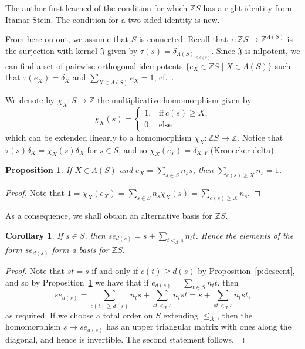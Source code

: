 \documentclass[reqno,11pt]{amsart}
\newcommand{\R}{\mathrel{\mathscr R}} %
\newtheorem{Prop}[Thm]{Proposition}
\newtheorem{Cor}[Thm]{Corollary}
{\theoremstyle{remark}
\newtheorem{Step}{Step}}
{\theoremstyle{remark}
\newtheorem{Example}[Thm]{Example}}
\numberwithin{equation}{section}
\begin{document}
The author first learned of the condition for which $\mathbb ZS$ has a right identity from Itamar Stein.  The condition for a two-sided identity is new.

From here on out, we assume that $S$ is connected.  Recall that $\tau\colon \mathbb ZS\to \mathbb Z^{\Lambda(S)}$ is the surjection with kernel $\mathfrak J$ given by $\tau(s) = \delta_{\Lambda(S)_{\leq c(s)}}$.  Since $\mathfrak J$ is nilpotent, we can find a set of pairwise orthogonal idempotents $\{e_X\in\mathbb ZS\mid X\in \Lambda(S)\}$ such that $\tau(e_X)=\delta_X$ and $\sum_{X\in \Lambda(S)}e_X=1$, cf.~\cite[Proposition 21.25]{LamBook}.  

We denote by $\chi_X\colon S\to \mathbb Z$ the multiplicative homomorphism given by \[\chi_X(s) = \begin{cases} 1, & \text{if}\ c(s)\geq X,\\ 0, & \text{else}\end{cases}\] which can be extended linearly to a homomorphism $\chi_X\colon \mathbb ZS\to \mathbb Z$.
Notice that $\tau(s)\delta_X = \chi_X(s)\delta_X$ for $s\in S$, and so $\chi_X(e_Y) = \delta_{X,Y}$ (Kronecker delta).

\begin{Prop}\label{p:support}
If $X\in \Lambda(S)$ and $e_X = \sum_{s\in S}n_ss$, then $\sum_{c(s)\geq X}n_s=1$.   \end{Prop}
\begin{proof}
Note that $1=\chi_X(e_X) = \sum_{s\in S}n_s\chi_X(s) = \sum_{c(s)\geq X} n_s$.    
\end{proof}

As a consequence, we shall obtain an alternative basis for $\mathbb ZS$.

\begin{Cor}\label{c:right.fix}
    If $s\in S$, then $se_{d(s)} = s+\sum_{t<_{\R}s} n_tt$.  Hence the elements of the form $se_{d(s)}$ form a basis for $\mathbb ZS$.
\end{Cor}
\begin{proof}
Note that $st=s$ if and only if $c(t)\geq d(s)$ by Proposition~\ref{p:descent}, and so by Proposition~\ref{p:support} we have that if $e_{d(s)} = \sum_{t\in S}n_tt$, then
\[se_{d(s)} = \sum_{c(t)\geq d(s)}n_ts+\sum_{st<_{\R} s}n_tst=s+\sum_{st<_{\R} s}n_tst,\] as required.    If we choose a total order on $S$ extending $\leq_{\R}$, then the homomorphism $s\mapsto se_{d(s)}$ has an upper triangular matrix with ones along the diagonal, and hence is invertible.  The second statement follows.
\end{proof}
\end{document}
